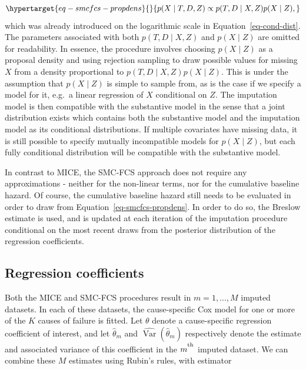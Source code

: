 \documentclass[
  letterpaper,
  DIV=11,
  numbers=noendperiod]{scrreprt}
\DeclareMathOperator{\Var}{Var}
\begin{document}
\begin{equation}\protect\hypertarget{eq-smcfcs-propdens}{}{
  p(X \mid T, D, Z) \propto p(T,D \mid X, Z)p(X \mid Z),
}\label{eq-smcfcs-propdens}\end{equation} which was already introduced
on the logarithmic scale in Equation~\ref{eq-cond-dist}. The parameters
associated with both \(p(T,D \mid X, Z)\) and \(p(X \mid Z)\) are
omitted for readability. In essence, the procedure involves choosing
\(p(X \mid Z)\) as a proposal density and using rejection sampling to
draw possible values for missing \(X\) from a density proportional to
\(p(T,D \mid X, Z)p(X \mid Z)\). This is under the assumption that
\(p(X \mid Z)\) is simple to sample from, as is the case if we specify a
model for it, e.g.~a linear regression of \(X\) conditional on \(Z\).
The imputation model is then compatible with the substantive model in
the sense that a joint distribution exists which contains both the
substantive model and the imputation model as its conditional
distributions. If multiple covariates have missing data, it is still
possible to specify mutually incompatible models for \(p(X \mid Z)\),
but each fully conditional distribution will be compatible with the
substantive model.

In contrast to MICE, the SMC-FCS approach does not require any
approximations - neither for the non-linear terms, nor for the
cumulative baseline hazard. Of course, the cumulative baseline hazard
still needs to be evaluated in order to draw from
Equation~\ref{eq-smcfcs-propdens}. In order to do so, the Breslow
estimate is used, and is updated at each iteration of the imputation
procedure conditional on the most recent draws from the posterior
distribution of the regression coefficients.

\hypertarget{regression-coefficients}{%
\subsection{Regression coefficients}\label{regression-coefficients}}

Both the MICE and SMC-FCS procedures result in \(m = 1,...,M\) imputed
datasets. In each of these datasets, the cause-specific Cox model for
one or more of the \(K\) causes of failure is fitted. Let \(\theta\)
denote a cause-specific regression coefficient of interest, and let
\(\hat{\theta}_m\) and \(\widehat{\Var}(\hat{\theta}_m)\) respectively
denote the estimate and associated variance of this coefficient in the
\(m^\textsuperscript{th}\) imputed dataset. We can combine these \(M\)
estimates using Rubin's rules, with estimator
\end{document}
